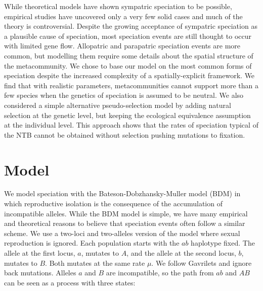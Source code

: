 \documentclass[12pt]{article}
\begin{document}

While theoretical models have shown sympatric speciation to be possible,
empirical studies have uncovered only a very few solid cases and much of the
theory is controversial. Despite the growing acceptance of sympatric
speciation as a plausible cause of speciation, most speciation events are
still thought to occur with limited gene flow. Allopatric and parapatric
speciation events are more common, but modelling them require some details
about the spatial structure of the metacommunity. We chose to base our model
on the most common forms of speciation despite the increased complexity of a
spatially-explicit framework. We find that with realistic parameters,
metacommunities cannot support more than a few species when the genetics of
speciation is assumed to be neutral. We also considered a simple alternative
pseudo-selection model by adding natural selection at the genetic level, but
keeping the ecological equivalence assumption at the individual level. This
approach shows that the rates of speciation typical of the NTB cannot be
obtained without selection pushing mutations to fixation.

\section{Model}

We model speciation with the Bateson-Dob\-zhan\-sky-Muller model (BDM) in
which reproductive isolation is the consequence of the accumulation of
incompatible alleles. While the BDM model is simple, we have many empirical
and theoretical reasons to believe that speciation events often follow a
similar scheme. We use a two-loci and two-alleles version of the model where
sexual reproduction is ignored. Each population starts with the $ab$ haplotype
fixed. The allele at the first locus, $a$, mutates to $A$, and the allele at
the second locus, $b$, mutates to $B$. Both mutates at the same rate $\mu$. We
follow Gavrilets and ignore back mutations. Alleles $a$ and $B$ are
incompatible, so the path from $ab$ and $AB$ can be seen as a process with
three states:
\end{document}

